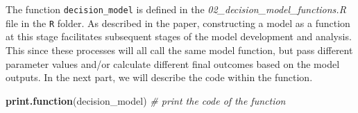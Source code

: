 \documentclass[]{book}
\newenvironment{Shaded}{\begin{snugshade}}{\end{snugshade}}
\newcommand{\KeywordTok}[1]{\textcolor[rgb]{0.13,0.29,0.53}{\textbf{#1}}}
\newcommand{\CommentTok}[1]{\textcolor[rgb]{0.56,0.35,0.01}{\textit{#1}}}
\newcommand{\NormalTok}[1]{#1}
\begin{document}
The function \texttt{decision\_model} is defined in the
\emph{02\_decision\_model\_functions.R} file in the \texttt{R} folder.
As described in the paper, constructing a model as a function at this
stage facilitates subsequent stages of the model development and
analysis. This since these processes will all call the same model
function, but pass different parameter values and/or calculate different
final outcomes based on the model outputs. In the next part, we will
describe the code within the function.

\begin{Shaded}
\begin{Highlighting}[]
\KeywordTok{print.function}\NormalTok{(decision_model) }\CommentTok{# print the code of the function}
\end{Highlighting}
\end{Shaded}
\end{document}
